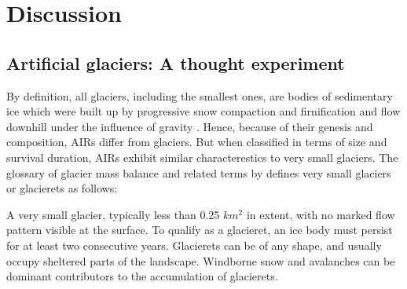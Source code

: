 \section{Discussion}





\subsection{Artificial glaciers: A thought experiment}

By definition, all glaciers, including the smallest ones, are bodies of sedimentary ice which were built up by
progressive snow compaction and firnification and flow downhill under the influence of gravity
\cite{benndouglasiGlaciersGlaciation2014}. Hence, because of their genesis and composition, AIRs differ from
glaciers. But when classified in terms of size and survival duration, AIRs exhibit similar characterestics to
very small glaciers. The glossary of glacier mass balance and related terms by
\citet{cogleyGlossaryGlacierMass2010} defines very small glaciers or glacierets as follows:

\begin{thesis_quotation}
  A very small glacier, typically less than 0.25 $km^2$ in extent, with no marked flow pattern
  visible at the surface. To qualify as a glacieret, an ice body must persist for at least two consecutive
  years. Glacierets can be of any shape, and usually occupy sheltered parts of the landscape. Windborne snow and
  avalanches can be dominant contributors to the accumulation of glacierets. 
\end{thesis_quotation}

